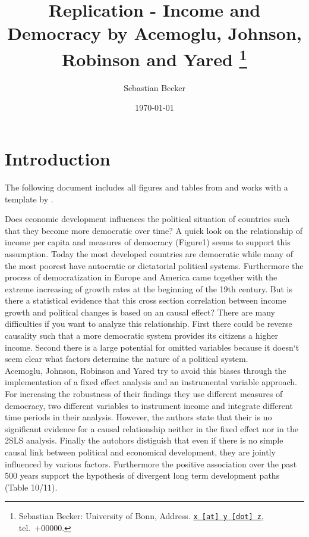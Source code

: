 \documentclass[11pt, a4paper, leqno]{article}
\begin{document}
\title{Replication - Income and Democracy by Acemoglu, Johnson, Robinson and Yared
\thanks{Sebastian Becker: University of Bonn, Address. \href{mailto:x@y.z} {\nolinkurl{x [at] y [dot] z}}, tel.~+00000.}
}

\author{Sebastian Becker
}

\date{
\today}

\maketitle
\clearpage

\section{Introduction} %
\label{sec:introduction}
The following document includes all figures and tables from \citet{Acemoglu1} and works with a template by \citet{GaudeckerEconProjectTemplates}.

Does economic development influences the political situation of countries such that they become more democratic over time? A quick look on the relationship of income per capita and measures of democracy (Figure1) seems to support this assumption. Today the most developed countries are democratic while many of the most poorest have autocratic or dictatorial political systems. Furthermore the process of democratization in Europe and America came together with the extreme increasing of growth rates at the beginning of the 19th century. But is there a statistical evidence that this cross section correlation between income growth and political changes is based on an causal effect? There are many difficulties if you want to analyze this relationship. First there could be reverse causality such that a more democratic system provides its citizens a higher income. Second there is a large potential for omitted variables because it doesn`t seem clear what factors determine the nature of a political system. \\
Acemoglu, Johnson, Robinson and Yared try to avoid this biases through the implementation of a fixed effect analysis and an instrumental variable approach. For increasing the robustness of their findings they use different measures of democracy, two different variables to instrument income and integrate different time periods in their analysis.
However, the authors state that their is no significant evidence for a causal relationship neither in the fixed effect nor in the 2SLS analysis. Finally the autohors distiguish that even if there is no simple causal link between political and economical development, they are jointly influenced by various factors. Furthermore the positive association over the past 500 years support the hypothesis of divergent long term development paths (Table 10/11).
\end{document}
